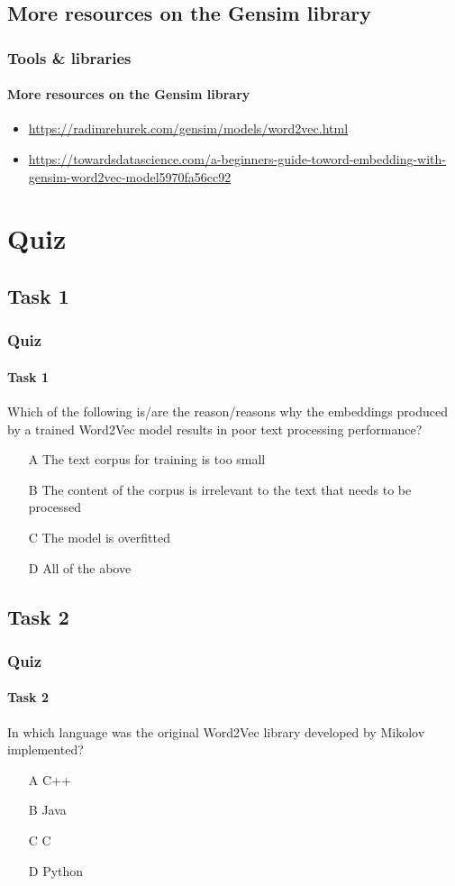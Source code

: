 \documentclass{beamer}
\begin{document}
\subsection{More resources on the Gensim library}
\begin{frame}
    \frametitle{Tools \& libraries}
    \framesubtitle{More resources on the Gensim library}
    \begin{itemize}
        \item \href{https://radimrehurek.com/gensim/models/word2vec.html}{https://radimrehurek.com/gensim/models/word2vec.html}
        \item \href{https://towardsdatascience.com/a-beginners-guide-toword-embedding-with-gensim-word2vec-model5970fa56cc92}{https://towardsdatascience.com/a-beginners-guide-toword-embedding-with-gensim-word2vec-model5970fa56cc92}
    \end{itemize}
\end{frame}

\section{Quiz}
\subsection{Task 1}
\begin{frame}
    \frametitle{Quiz}
    \framesubtitle{Task 1}
    Which of the following is/are the reason/reasons why the embeddings produced by a trained Word2Vec model results in poor text processing performance?
    \begin{enumerate}
        \item[A] The text corpus for training is too small
        \item[B] The content of the corpus is irrelevant to the text that needs to be processed
        \item[C] The model is overfitted
        \item[D] All of the above
    \end{enumerate}
\end{frame}

\subsection{Task 2}
\begin{frame}
    \frametitle{Quiz}
    \framesubtitle{Task 2}
    In which language was the original Word2Vec library developed by Mikolov implemented?
    \begin{enumerate}
        \item[A] C++
        \item[B] Java
        \item[C] C
        \item[D] Python
    \end{enumerate}
\end{frame}
\end{document}
